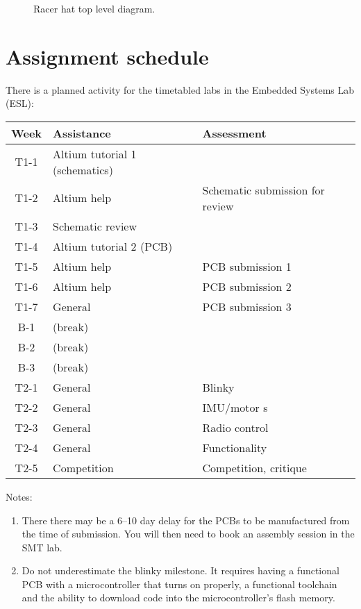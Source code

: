 \documentclass[11pt, a4paper]{article}
\begin{document}
\begin{figure}[h]
  \centering
  
  \caption{Racer hat top level diagram.}
\end{figure}


\pagebreak

\section{Assignment schedule}

There is a planned activity for the timetabled labs in the Embedded
Systems Lab (ESL):
%
\begin{flushleft}
  \begin{tabular}{ c l l }
    Week            &  Assistance  &  Assessment \\
    \hline \hline
    T1-1 & Altium tutorial 1 (schematics)  & \\
    T1-2 & Altium help       & Schematic submission for review  \\
    T1-3 & Schematic review  &                \\
    T1-4 & Altium tutorial 2 (PCB) &          \\
    T1-5 & Altium help & PCB submission 1    \\
    T1-6 & Altium help & PCB submission 2    \\
    T1-7 & General     & PCB submission 3    \\
    B-1 & (break)    &                   \\
    B-2 & (break)    &                   \\
    B-3 & (break)    &                   \\
    T2-1 & General     & Blinky            \\
    T2-2 & General     & IMU/motor  s      \\
    T2-3 & General     & Radio control     \\    
    T2-4 & General     & Functionality     \\
    T2-5 & Competition & Competition, critique  \\
  \end{tabular}
\end{flushleft}


Notes:
%
\begin{enumerate}
\item There there may be a 6--10 day delay for the PCBs to be
  manufactured from the time of submission.  You will then need to
  book an assembly session in the SMT lab.

\item Do not underestimate the blinky milestone.  It requires having a
  functional PCB with a microcontroller that turns on properly, a
  functional toolchain and the ability to download code into the
  microcontroller's flash memory.
\end{enumerate}
\end{document}
